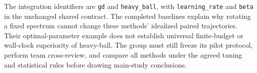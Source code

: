 \documentclass[11pt,a4paper]{article}
\begin{document}
The integration identifiers are \texttt{gd} and \texttt{heavy\_ball}, with
\texttt{learning\_rate} and \texttt{beta} in the unchanged shared contract.
The completed baselines explain why rotating a fixed spectrum cannot change
these methods' idealized paired trajectories. Their optimal-parameter example
does not establish universal finite-budget or wall-clock superiority of
heavy-ball. The group must still freeze its pilot protocol, perform team
cross-review, and compare all methods under the agreed tuning and statistical
rules before drawing main-study conclusions.
\end{document}
